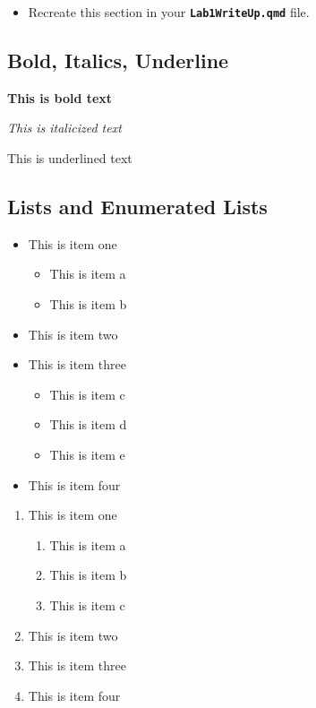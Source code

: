 \documentclass[
]{article}
\providecommand{\tightlist}{%
  \setlength{\itemsep}{0pt}\setlength{\parskip}{0pt}}
\begin{document}
\begin{itemize}
\tightlist
\item
  Recreate this section in your \textbf{\texttt{Lab1WriteUp.qmd}} file.
\end{itemize}

\subsection{Bold, Italics, Underline}\label{bold-italics-underline}

\textbf{This is bold text}

\emph{This is italicized text}

This is underlined text

\subsection{Lists and Enumerated
Lists}\label{lists-and-enumerated-lists}

\begin{itemize}
\tightlist
\item
  This is item one

  \begin{itemize}
  \tightlist
  \item
    This is item a
  \item
    This is item b
  \end{itemize}
\item
  This is item two
\item
  This is item three

  \begin{itemize}
  \tightlist
  \item
    This is item c
  \item
    This is item d
  \item
    This is item e
  \end{itemize}
\item
  This is item four
\end{itemize}

\begin{enumerate}
\def\labelenumi{\arabic{enumi}.}
\tightlist
\item
  This is item one

  \begin{enumerate}
  \def\labelenumii{\alph{enumii}.}
  \tightlist
  \item
    This is item a
  \item
    This is item b
  \item
    This is item c
  \end{enumerate}
\item
  This is item two
\item
  This is item three
\item
  This is item four
\end{enumerate}
\end{document}
